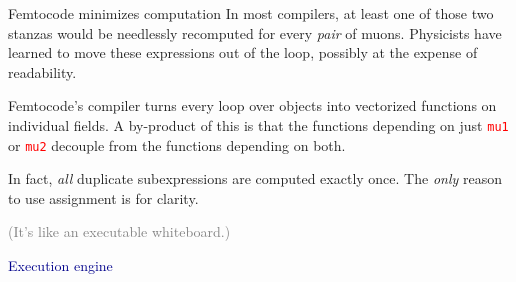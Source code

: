 \documentclass{beamer}
\begin{document}
\begin{frame}{Femtocode minimizes computation}
In most compilers, at least one of those two stanzas would be needlessly recomputed for every {\it pair} of muons. Physicists have learned to move these expressions out of the loop, possibly at the expense of readability.

\vfill
Femtocode's compiler turns every loop over objects into vectorized functions on individual fields. A by-product of this is that the functions depending on just \textcolor{red}{\tt mu1} or \textcolor{red}{\tt mu2} decouple from the functions depending on both.

\vfill
In fact, {\it all} duplicate subexpressions are computed exactly once. The {\it only} reason to use assignment is for clarity.

\vfill
\textcolor{gray}{(It's like an executable whiteboard.)}
\end{frame}

\begin{frame}{}
\begin{center}
\LARGE \textcolor{darkblue}{Execution engine}
\end{center}
\end{frame}
\end{document}
